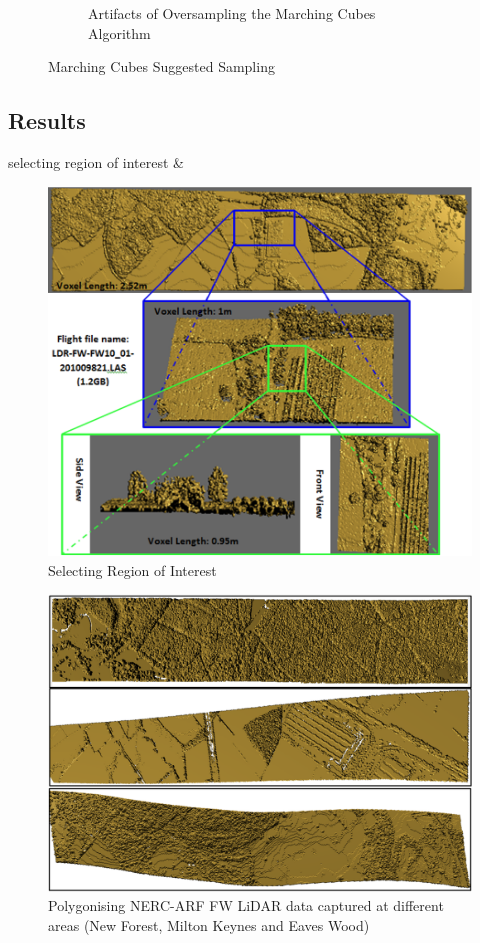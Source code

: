 \documentclass{subfiles}
\begin{document}
\begin{figure} [h!]
\begin{subfigure}[t]{.49\textwidth}
    		\caption{Artifacts of Oversampling the Marching Cubes Algorithm} 
    		\label{fig:SamplingArtifacts}
    	\end{subfigure} \hfill
    	\caption{Marching Cubes Suggested Sampling}
    	\label{fig:MCSampling}
    \end{figure}


\subsection{Results}

 
 selecting region of interest \&
 

 \begin{figure} [h!]
 	\centering
 	\includegraphics[width=.8\textwidth]{img/SelectingRegionOfInterest}
 	\caption[Selecting Region of Interest]{Selecting Region of Interest}
 	\label{fig:SelectingRegionOfInterest}
 \end{figure}
 
 
  \begin{figure} [h!]
  	\centering
  	\includegraphics[width=.8\textwidth]{img/VariousFlightlines}
  	\caption[Various Flightlines Visualisation]{Polygonising NERC-ARF FW LiDAR data captured at different areas (New Forest, Milton Keynes and Eaves Wood)}
  	\label{fig:VariousFlightlines}
  \end{figure}
  
\end{document}
